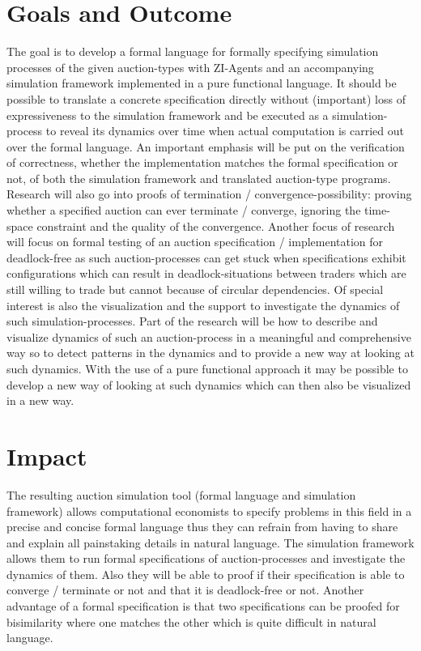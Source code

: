 \documentclass{article}
\begin{document}
 

\section{Goals and Outcome}
The goal is to develop a formal language for formally specifying simulation processes of the given auction-types with ZI-Agents and an accompanying simulation framework implemented in a pure functional language. It should be possible to translate a concrete specification directly without (important) loss of expressiveness to the simulation framework and be executed as a simulation-process to reveal its dynamics over time when actual computation is carried out over the formal language.
An important emphasis will be put on the verification of correctness, whether the implementation matches the formal specification or not, of both the simulation framework and translated auction-type programs.
Research will also go into proofs of termination / convergence-possibility: proving whether a specified auction can ever terminate / converge, ignoring the time-space constraint and the quality of the convergence. Another focus of research will focus on formal testing of an auction specification / implementation for deadlock-free as such auction-processes can get stuck when specifications exhibit configurations which can result in deadlock-situations between traders which are still willing to trade but cannot because of circular dependencies.
Of special interest is also the visualization and the support to investigate the dynamics of such simulation-processes. Part of the research will be how to describe and visualize dynamics of such an auction-process in a meaningful and comprehensive way so to detect patterns in the dynamics and to provide a new way at looking at such dynamics. With the use of a pure functional approach it may be possible to develop a new way of looking at such dynamics which can then also be visualized in a new way.


\section{Impact}
The resulting auction simulation tool (formal language and simulation framework) allows computational economists to specify problems in this field in a precise and concise formal language thus they can refrain from having to share and explain all painstaking details in natural language. The simulation framework allows them to run formal specifications of auction-processes and investigate the dynamics of them. Also they will be able to proof if their specification is able to converge / terminate or not and that it is deadlock-free or not.
Another advantage of a formal specification is that two specifications can be proofed for bisimilarity where one matches the other which is quite difficult in natural language.
\end{document}
